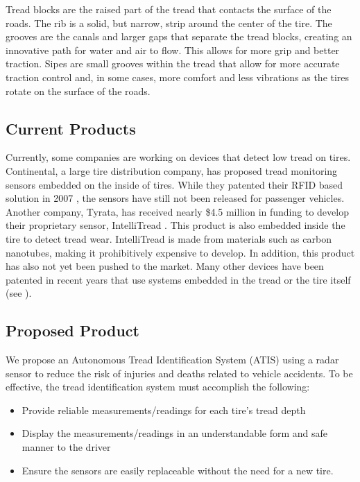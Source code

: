 \documentclass[11pt]{IEEEtran}
\begin{document}
			Tread blocks are the raised part of the tread that contacts the surface of the roads. The rib is a solid, but narrow, strip around the center of the tire. The grooves are the canals and larger gaps that separate the tread blocks, creating an innovative path for water and air to flow. This allows for more grip and better traction. Sipes are small grooves within the tread that allow for more accurate traction control and, in some cases, more comfort and less vibrations as the tires rotate on the surface of the roads. 

		\subsection{Current Products}
			Currently, some companies are working on devices that detect low tread on tires. Continental, a large tire distribution company, has proposed tread monitoring sensors embedded on the inside of tires. While they patented their RFID based solution in 2007 \cite{continentalPatent}, the sensors have still not been released for passenger vehicles. Another company, Tyrata, has received nearly \$4.5 million in funding to develop their proprietary sensor, IntelliTread \cite{intellitread}. This product is also embedded inside the tire to detect tread wear. IntelliTread is made from materials such as carbon nanotubes, making it prohibitively expensive to develop. In addition, this product has also not yet been pushed to the market. Many other devices have been patented in recent years that use systems embedded in the tread or the tire itself (see \cite{goodyearPatent1, nxpbvPatent, goodyearPatent2, patent4}).

		\subsection{Proposed Product}
			We propose an Autonomous Tread Identification System (ATIS) using a radar sensor to reduce the risk of injuries and deaths related to vehicle accidents. To be effective, the tread identification system must accomplish the following:

			\begin{itemize}
				\item Provide reliable measurements/readings for each tire’s tread depth
				\item Display the measurements/readings in an understandable form and safe manner to the driver
				\item Ensure the sensors are easily replaceable without the need for a new tire. 
			\end{itemize}
\end{document}
